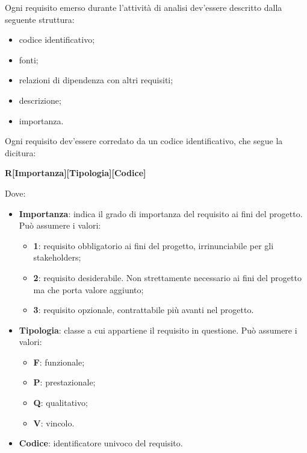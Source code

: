  				    Ogni requisito emerso durante l'attività di analisi dev'essere descritto dalla seguente struttura:
                    \begin{itemize}
                    	\item{codice identificativo;}
                     	\item{fonti;} 
                     	\item{relazioni di dipendenza con altri requisiti;}
                      	\item{descrizione;}
                      	\item{importanza.}
                     \end{itemize}
                     
                	\noindent Ogni requisito dev'essere corredato da un codice identificativo, che segue la dicitura: 
                    \begin{center}
                    \textbf{R[Importanza][Tipologia][Codice]}
                    \end{center}
                    Dove:
                    \begin{itemize}
                        	\item{\textbf{Importanza}: indica il grado di importanza del requisito ai fini del progetto. Può assumere i valori:}
                        	\begin{itemize}
                                	\item{\textbf{1}: requisito obbligatorio ai fini del progetto, irrinunciabile per gli stakeholders;}
                                	\item{\textbf{2}: requisito desiderabile. Non strettamente necessario ai fini del progetto ma che porta valore aggiunto;}
                                	\item{\textbf{3}: requisito opzionale, contrattabile più avanti nel progetto.}
                        	\end{itemize}
                        	\item{\textbf{Tipologia}: classe a cui appartiene il requisito in questione. Può assumere i valori:}
                        	\begin{itemize}
                        		\item{\textbf{F}: funzionale;}
                        		\item{\textbf{P}: prestazionale;}
                        		\item{\textbf{Q}: qualitativo;}
                        		\item{\textbf{V}: vincolo.}
                        	\end{itemize}
                        	\item{\textbf{Codice}: identificatore univoco del requisito}.
                    \end{itemize}
                    
